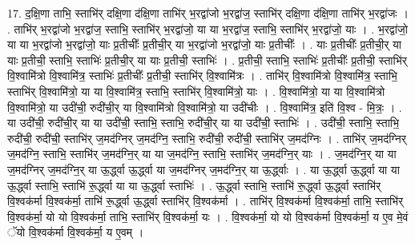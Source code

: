 \documentclass[17pt]{extarticle}
\begin{document}
17. द॒क्षि॒णा ताभि॒ स्ताभि॑र् दक्षि॒णा द॑क्षि॒णा ताभि॑र् भ॒रद्वा॑जो भ॒रद्वा॑ज॒ स्ताभि॑र् दक्षि॒णा द॑क्षि॒णा ताभि॑र् भ॒रद्वा॑जः । . ताभि॑र् भ॒रद्वा॑जो भ॒रद्वा॑ज॒ स्ताभि॒ स्ताभि॑र् भ॒रद्वा॑जो॒ या या भ॒रद्वा॑ज॒ स्ताभि॒ स्ताभि॑र् भ॒रद्वा॑जो॒ याः । . भ॒रद्वा॑जो॒ या या भ॒रद्वा॑जो भ॒रद्वा॑जो॒ याः प्र॒तीचीः᳚ प्र॒तीची॒र् या भ॒रद्वा॑जो भ॒रद्वा॑जो॒ याः प्र॒तीचीः᳚ । . याः प्र॒तीचीः᳚ प्र॒तीची॒र् या याः प्र॒तीची॒ स्ताभि॒ स्ताभिः॑ प्र॒तीची॒र् या याः प्र॒तीची॒ स्ताभिः॑ । . प्र॒तीची॒ स्ताभि॒ स्ताभिः॑ प्र॒तीचीः᳚ प्र॒तीची॒ स्ताभि॑र् वि॒श्वामि॑त्रो वि॒श्वामि॑त्र॒ स्ताभिः॑ प्र॒तीचीः᳚ प्र॒तीची॒ स्ताभि॑र् वि॒श्वामि॑त्रः । . ताभि॑र् वि॒श्वामि॑त्रो वि॒श्वामि॑त्र॒ स्ताभि॒ स्ताभि॑र् वि॒श्वामि॑त्रो॒ या या वि॒श्वामि॑त्र॒ स्ताभि॒ स्ताभि॑र् वि॒श्वामि॑त्रो॒ याः । . वि॒श्वामि॑त्रो॒ या या वि॒श्वामि॑त्रो वि॒श्वामि॑त्रो॒ या उदी॑ची॒ रुदी॑ची॒र् या वि॒श्वामि॑त्रो वि॒श्वामि॑त्रो॒ या उदी॑चीः । . वि॒श्वामि॑त्र॒ इति॑ वि॒श्व - मि॒त्रः॒ । . या उदी॑ची॒ रुदी॑ची॒र् या या उदी॑ची॒ स्ताभि॒ स्ताभि॒ रुदी॑ची॒र् या या उदी॑ची॒ स्ताभिः॑ । . उदी॑ची॒ स्ताभि॒ स्ताभि॒ रुदी॑ची॒ रुदी॑ची॒ स्ताभि॑र् ज॒मद॑ग्निर् ज॒मद॑ग्नि॒ स्ताभि॒ रुदी॑ची॒ रुदी॑ची॒ स्ताभि॑र् ज॒मद॑ग्निः । . ताभि॑र् ज॒मद॑ग्निर् ज॒मद॑ग्नि॒ स्ताभि॒ स्ताभि॑र् ज॒मद॑ग्नि॒र् या या ज॒मद॑ग्नि॒ स्ताभि॒ स्ताभि॑र् ज॒मद॑ग्नि॒र् याः । . ज॒मद॑ग्नि॒र् या या ज॒मद॑ग्निर् ज॒मद॑ग्नि॒र् या ऊ॒र्द्ध्वा ऊ॒र्द्ध्वा या ज॒मद॑ग्निर् ज॒मद॑ग्नि॒र् या ऊ॒र्द्ध्वाः । . या ऊ॒र्द्ध्वा ऊ॒र्द्ध्वा या या ऊ॒र्द्ध्वा स्ताभि॒ स्ताभि॑ रू॒र्द्ध्वा या या ऊ॒र्द्ध्वा स्ताभिः॑ । . ऊ॒र्द्ध्वा स्ताभि॒ स्ताभि॑ रू॒र्द्ध्वा ऊ॒र्द्ध्वा स्ताभि॑र् वि॒श्वक॑र्मा वि॒श्वक॑र्मा॒ ताभि॑ रू॒र्द्ध्वा ऊ॒र्द्ध्वा स्ताभि॑र् वि॒श्वक॑र्मा । . ताभि॑र् वि॒श्वक॑र्मा वि॒श्वक॑र्मा॒ ताभि॒ स्ताभि॑र् वि॒श्वक॑र्मा॒ यो यो वि॒श्वक॑र्मा॒ ताभि॒ स्ताभि॑र् वि॒श्वक॑र्मा॒ यः । . वि॒श्वक॑र्मा॒ यो यो वि॒श्वक॑र्मा वि॒श्वक॑र्मा॒ य ए॒व मे॒वं ॅयो वि॒श्वक॑र्मा वि॒श्वक॑र्मा॒ य ए॒वम् । \newline
\end{document}
